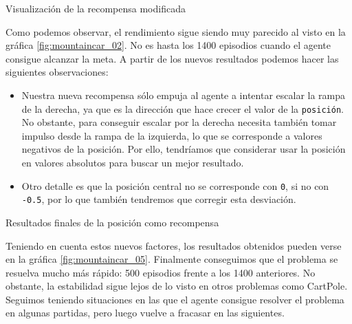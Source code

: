 %
       {Visualización de la recompensa modificada}

Como podemos observar, el rendimiento sigue siendo muy parecido al visto en la gráfica \ref{fig:mountaincar_02}. No es hasta los 1400 episodios cuando el agente consigue alcanzar la meta. A partir de los nuevos resultados podemos hacer las siguientes observaciones:

\begin{itemize}
    \item Nuestra nueva recompensa sólo empuja al agente a intentar escalar la rampa de la derecha, ya que es la dirección que hace crecer el valor de la \texttt{posición}. No obstante, para conseguir escalar por la derecha necesita también tomar impulso desde la rampa de la izquierda, lo que se corresponde a valores negativos de la posición. Por ello, tendríamos que considerar usar la posición en valores absolutos para buscar un mejor resultado.
    \item Otro detalle es que la posición central no se corresponde con \texttt{0}, si no con \texttt{-0.5}, por lo que también tendremos que corregir esta desviación.
\end{itemize}

%
       {Resultados finales de la posición como recompensa}

Teniendo en cuenta estos nuevos factores, los resultados obtenidos pueden verse en la gráfica \ref{fig:mountaincar_05}. Finalmente conseguimos que el problema se resuelva mucho más rápido: 500 episodios frente a los 1400 anteriores. No obstante, la estabilidad sigue lejos de lo visto en otros problemas como CartPole. Seguimos teniendo situaciones en las que el agente consigue resolver el problema en algunas partidas, pero luego vuelve a fracasar en las siguientes.

